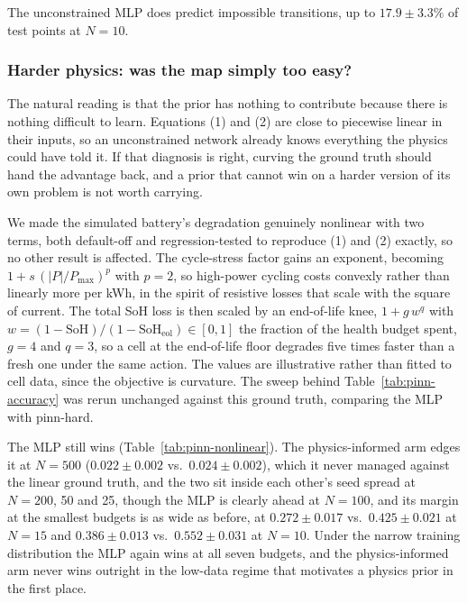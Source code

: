 \documentclass[conference]{IEEEtran}
\begin{document}
The unconstrained MLP does predict impossible transitions, up to $17.9\pm3.3\%$ of test points at $N{=}10$.

\subsubsection{Harder physics: was the map simply too easy?}
\label{sec:results-pinn-nonlinear}

The natural reading is that the prior has nothing to contribute because there is nothing difficult to learn. Equations (1) and (2) are close to piecewise linear in their inputs, so an unconstrained network already knows everything the physics could have told it. If that diagnosis is right, curving the ground truth should hand the advantage back, and a prior that cannot win on a harder version of its own problem is not worth carrying.

We made the simulated battery's degradation genuinely nonlinear with two terms, both default-off and regression-tested to reproduce (1) and (2) exactly, so no other result is affected. The cycle-stress factor gains an exponent, becoming $1 + s\,(|P|/P_{\max})^{p}$ with $p{=}2$, so high-power cycling costs convexly rather than linearly more per kWh, in the spirit of resistive losses that scale with the square of current. The total SoH loss is then scaled by an end-of-life knee, $1 + g\,w^{q}$ with $w = (1 - \mathrm{SoH})/(1 - \mathrm{SoH}_{\mathrm{eol}}) \in [0,1]$ the fraction of the health budget spent, $g{=}4$ and $q{=}3$, so a cell at the end-of-life floor degrades five times faster than a fresh one under the same action. The values are illustrative rather than fitted to cell data, since the objective is curvature. The sweep behind Table~\ref{tab:pinn-accuracy} was rerun unchanged against this ground truth, comparing the MLP with pinn-hard.

The MLP still wins (Table~\ref{tab:pinn-nonlinear}). The physics-informed arm edges it at $N{=}500$ ($0.022\pm0.002$ vs.\ $0.024\pm0.002$), which it never managed against the linear ground truth, and the two sit inside each other's seed spread at $N = 200$, 50 and 25, though the MLP is clearly ahead at $N{=}100$, and its margin at the smallest budgets is as wide as before, at $0.272\pm0.017$ vs.\ $0.425\pm0.021$ at $N{=}15$ and $0.386\pm0.013$ vs.\ $0.552\pm0.031$ at $N{=}10$. Under the narrow training distribution the MLP again wins at all seven budgets, and the physics-informed arm never wins outright in the low-data regime that motivates a physics prior in the first place.
\end{document}
